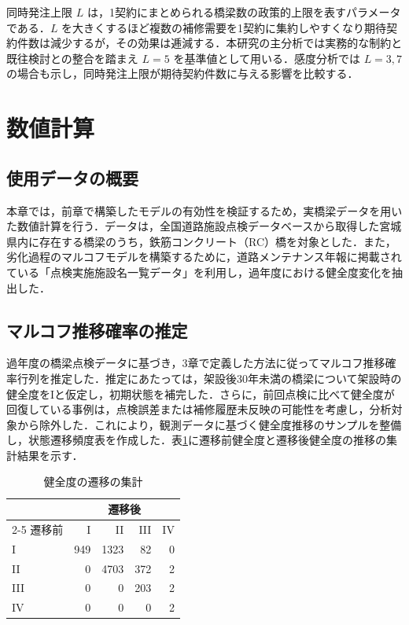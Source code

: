 \documentclass[Journal,letterpaper,InsideFigs,NoLineNumbers]{ascelike-new}
\begin{document}
同時発注上限 \(L\) は，1契約にまとめられる橋梁数の政策的上限を表すパラメータである．\(L\) を大きくするほど複数の補修需要を1契約に集約しやすくなり期待契約件数は減少するが，その効果は逓減する．本研究の主分析では実務的な制約と既往検討との整合を踏まえ \(L=5\) を基準値として用いる．感度分析では \(L=3,7\) の場合も示し，同時発注上限が期待契約件数に与える影響を比較する．

\section{数値計算}

\subsection{使用データの概要}

本章では，前章で構築したモデルの有効性を検証するため，実橋梁データを用いた数値計算を行う．データは，全国道路施設点検データベース\cite{roadstructuresdb}から取得した宮城県内に存在する橋梁のうち，鉄筋コンクリート（RC）橋を対象とした．また，劣化過程のマルコフモデルを構築するために，道路メンテナンス年報に掲載されている「点検実施施設名一覧データ」\cite{roadmaintenance}を利用し，過年度における健全度変化を抽出した．

\subsection{マルコフ推移確率の推定}

過年度の橋梁点検データに基づき，3章で定義した方法に従ってマルコフ推移確率行列を推定した．推定にあたっては，架設後30年未満の橋梁について架設時の健全度をIと仮定し，初期状態を補完した．さらに，前回点検に比べて健全度が回復している事例は，点検誤差または補修履歴未反映の可能性を考慮し，分析対象から除外した．これにより，観測データに基づく健全度推移のサンプルを整備し，状態遷移頻度表を作成した．表\ref{tab:transition_counts}に遷移前健全度と遷移後健全度の推移の集計結果を示す．

\begin{table}[h]
\centering
\caption{健全度の遷移の集計}
\label{tab:transition_counts}
\begin{tabular}{lrrrr}
\toprule
 & \multicolumn{4}{c}{遷移後} \\
\cmidrule(lr){2-5}
遷移前 & I & II & III & IV \\
\midrule
I & 949 & 1323 & 82 & 0 \\
II & 0 & 4703 & 372 & 2 \\
III & 0 & 0 & 203 & 2 \\
IV & 0 & 0 & 0 & 2 \\
\bottomrule
\end{tabular}
\end{table}
\end{document}
